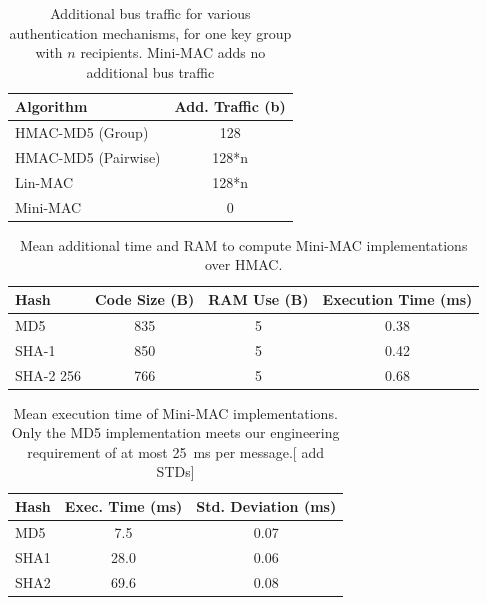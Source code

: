 	
	\begin{table}
	\centering
	\caption{Additional bus traffic for various authentication mechanisms, 
	for one key group with $n$ recipients.  Mini-MAC adds no additional bus traffic}
	\label{tab-traffic}
	\vspace{8pt}
	\begin{tabular}{l|c}%
	\bfseries Algorithm & \bfseries Add. Traffic (b) \\\hline 
	HMAC-MD5 (Group) & 128 \\
	HMAC-MD5 (Pairwise) & 128*n \\
	Lin-MAC & 128*n \\
	Mini-MAC & 0 \\
	\hline
	\end{tabular}
	\end{table}

	\begin{table}	
	\centering	
	\caption{Mean additional time and RAM to compute Mini-MAC implementations over HMAC.}
	\label{tab-overhead}
	\vspace{8pt}
	\begin{tabular}{l|c|c|c}%
	\bfseries Hash & \bfseries Code Size (B) & \bfseries RAM Use (B) & \bfseries Execution Time (ms)\\\hline 
	MD5 & 835 & 5 & 0.38 \\
	SHA-1 & 850 & 5 & 0.42 \\
	SHA-2 256 & 766 & 5 & 0.68 \\
	\hline
	\end{tabular}
	\end{table}
	
	\begin{table}
	\centering
	\caption{Mean execution time of Mini-MAC implementations.
	Only the MD5 implementation meets our engineering requirement of at most 25~ms per message.[ add STDs]}
	\label{tab-time}
	\vspace{8pt}
	\begin{tabular}{ @{}l | S[table-format=2.1] | @{}c}
		\hspace{2pt}\textbf{Hash} & {\textbf{Exec. Time (ms)}} & {\textbf{Std. Deviation (ms)}} \\
		\hline 
		\hspace{2pt}MD5 & 7.5 & 0.07 \\
		\hspace{2pt}SHA1 & 28.0 & 0.06 \\
		\hspace{2pt}SHA2 & 69.6 & 0.08 \\ 
	\end{tabular}	
	\end{table}
	
